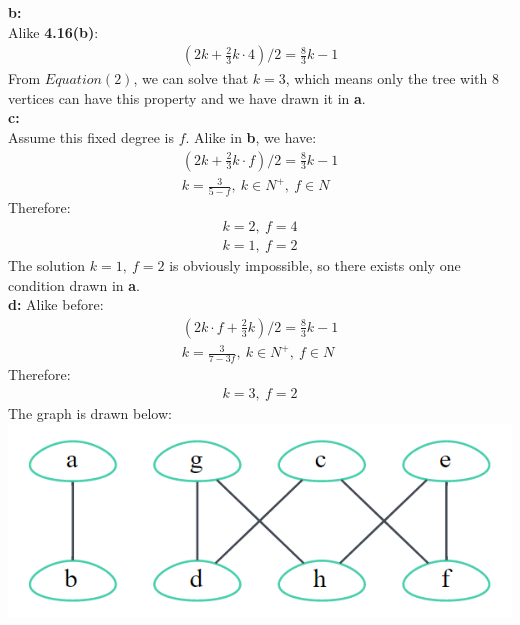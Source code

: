 \documentclass{article}
\begin{document}
\textbf{b:}\\
Alike \textbf{4.16(b)}:
\begin{equation}
\begin{aligned}
\left(2k+\frac{2}{3}k\cdot 4\right)/2=\frac{8}{3}k-1
\end{aligned}
\end{equation}
From $Equation(2)$, we can solve that $k=3$, which means only the tree with $8$ vertices can have this property and we have drawn it in \textbf{a}.\\
\textbf{c:}\\
Assume this fixed degree is $f$. Alike in \textbf{b}, we have:
\begin{equation}
\begin{aligned}
\left(2k+\frac{2}{3}k\cdot f\right)/2=\frac{8}{3}k-1
\\k=\frac{3}{5-f},\ k\in N^+,\ f\in N
\end{aligned}
\end{equation}
Therefore:
\begin{equation}
\begin{aligned}
k=2,\ f=4\\
k=1,\ f=2
\end{aligned}
\end{equation}
The solution $k=1,\ f=2$ is obviously impossible, so there exists only one condition drawn in \textbf{a}.\\
\textbf{d:}
Alike before:
\begin{equation}
\begin{aligned}
\left(2k\cdot f+\frac{2}{3}k\right)/2=\frac{8}{3}k-1\\
k=\frac{3}{7-3f},\ k\in N^+,\ f\in N
\end{aligned}
\end{equation}
Therefore:
\begin{equation}
\begin{aligned}
k=3,\ f=2
\end{aligned}
\end{equation}
The graph is drawn below:\\
\includegraphics[scale=0.3]{17_3.png}
\end{document}

